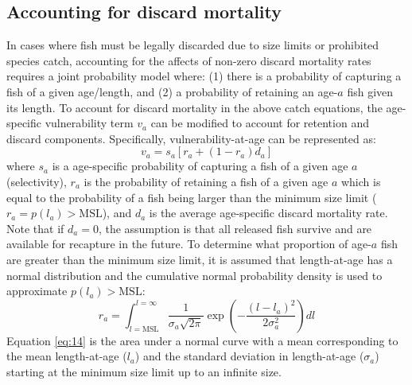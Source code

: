 \documentclass[12pt]{article}
\begin{document}
\subsection{Accounting for discard mortality} %
\label{sub:accounting_for_discard_mortality}
In cases where fish must be legally discarded due to size limits or prohibited species catch, accounting for the affects of non-zero discard mortality rates requires a joint probability model where: (1) there is a probability of capturing a fish of a given age/length, and (2) a probability of retaining an age-$a$ fish given its length.  To account for discard mortality in the above catch equations, the age-specific vulnerability term $v_a$ can be modified to account for retention and discard components.  Specifically, vulnerability-at-age can be represented as:
\begin{equation}\label{eq:13}
	v_a = s_a [r_a+(1-r_a)d_a]
\end{equation}
where $s_a$ is a age-specific probability of capturing a fish of a given age $a$ (selectivity), $r_a$ is the probability of retaining a fish of a given age $a$ which is equal to the probability of a fish being larger than the minimum size limit ($r_a=p(l_a)>\mathrm{MSL}$), and $d_a$ is the average age-specific discard mortality rate.  Note that if $d_a=0$, the assumption is that all released fish survive and are available for recapture in the future.  To determine what proportion of age-$a$ fish are greater than the minimum size limit, it is assumed that length-at-age has a normal distribution and the cumulative normal probability density is used to approximate $p(l_a)>\mathrm{MSL}$:
\begin{equation}\label{eq:14}
	r_a = \int_{l=\mathrm{MSL}}^{l=\infty} \frac{1}{\sigma_a\sqrt{2\pi}} 
	\exp\left(-\frac{(l-l_a)^2}{2\sigma_a^2} \right)dl
\end{equation}
Equation \ref{eq:14} is the area under a normal curve with a mean corresponding to the mean length-at-age ($l_a$) and the standard deviation in length-at-age ($\sigma_a$) starting at the minimum size limit up to an infinite size.
\end{document}
